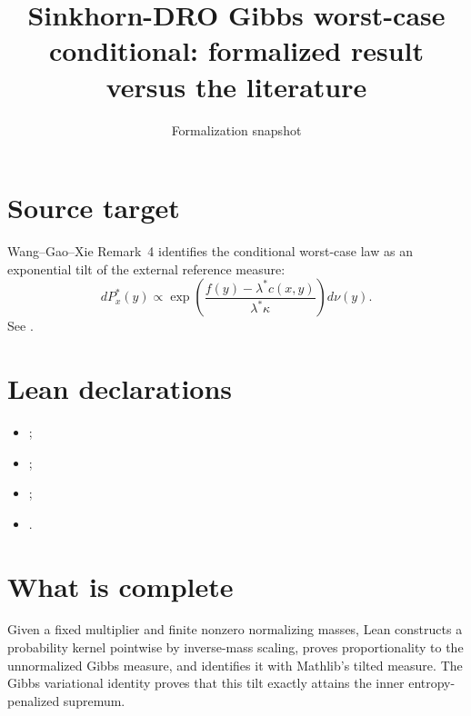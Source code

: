 \title{Sinkhorn-DRO Gibbs worst-case conditional: formalized result versus the literature}
\author{}
\date{Formalization snapshot \snapshot}

\maketitle
{}
\section{Source target}
Wang--Gao--Xie Remark~4 identifies the conditional worst-case law as an exponential tilt of the external reference measure:
\[
 dP_x^*(y)\propto
 \exp\left(\frac{f(y)-\lambda^*c(x,y)}{\lambda^*\kappa}\right)d\nu(y).
\]
See .

\section{Lean declarations}
\begin{itemize}[leftmargin=2em]
\item {};
\item {};
\item {};
\item {}.
\end{itemize}

\section{What is complete}
Given a fixed multiplier and finite nonzero normalizing masses, Lean constructs a probability kernel pointwise by inverse-mass scaling, proves proportionality to the unnormalized Gibbs measure, and identifies it with Mathlib's tilted measure.  The Gibbs variational identity proves that this tilt exactly attains the inner entropy-penalized supremum.

